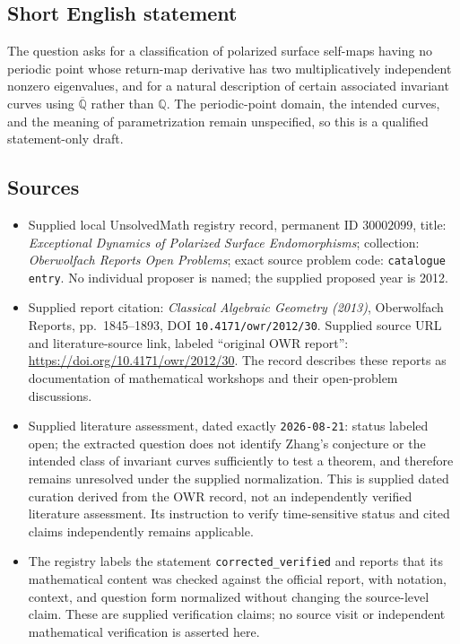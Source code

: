 \documentclass[11pt]{article}
\newcommand{\Q}{\mathbb{Q}}
\begin{document}
\subsection{Short English statement}
The question asks for a classification of polarized surface self-maps having no periodic point whose return-map derivative has two multiplicatively independent nonzero eigenvalues, and for a natural description of certain associated invariant curves using \(\overline{\Q}\) rather than \(\Q\). The periodic-point domain, the intended curves, and the meaning of parametrization remain unspecified, so this is a qualified statement-only draft.
\subsection{Sources}
\begin{itemize}
\item Supplied local UnsolvedMath registry record, permanent ID \(30002099\), title: \emph{Exceptional Dynamics of Polarized Surface Endomorphisms}; collection: \emph{Oberwolfach Reports Open Problems}; exact source problem code: \texttt{catalogue entry}. No individual proposer is named; the supplied proposed year is 2012.
\item Supplied report citation: \emph{Classical Algebraic Geometry (2013)}, Oberwolfach Reports, pp.\ 1845--1893, DOI \texttt{10.4171/owr/2012/30}. Supplied source URL and literature-source link, labeled ``original OWR report'': \url{https://doi.org/10.4171/owr/2012/30}. The record describes these reports as documentation of mathematical workshops and their open-problem discussions.
\item Supplied literature assessment, dated exactly \texttt{2026-08-21}: status labeled open; the extracted question does not identify Zhang's conjecture or the intended class of invariant curves sufficiently to test a theorem, and therefore remains unresolved under the supplied normalization. This is supplied dated curation derived from the OWR record, not an independently verified literature assessment. Its instruction to verify time-sensitive status and cited claims independently remains applicable.
\item The registry labels the statement \texttt{corrected\_verified} and reports that its mathematical content was checked against the official report, with notation, context, and question form normalized without changing the source-level claim. These are supplied verification claims; no source visit or independent mathematical verification is asserted here.
\end{itemize}
\end{document}
